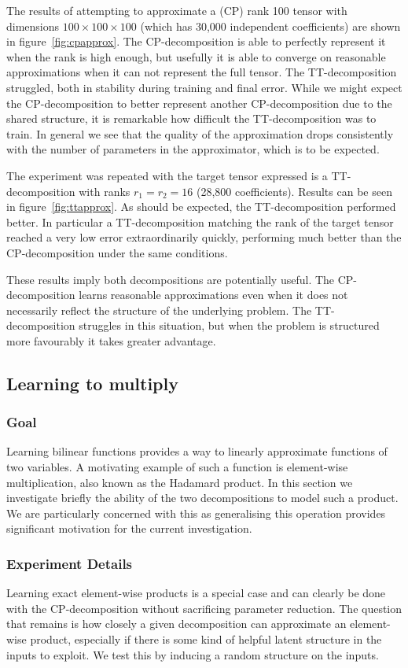 The results of attempting to approximate a (CP) rank 100 tensor with dimensions 
\(100 \times 100 \times 100\) (which has 30,000 independent coefficients) 
are shown in figure~\ref{fig:cpapprox}.
The CP-decomposition is able to perfectly represent it when the rank is high enough,
but usefully it is able to converge on reasonable approximations when it can not
represent the full tensor.
The TT-decomposition struggled, both in stability during training and final error.
While we might expect the CP-decomposition to better represent another CP-decomposition due to
the shared structure, it is remarkable how difficult the TT-decomposition was to
train.
In general we see that the quality of the approximation drops consistently with the
number of parameters in the approximator, which is to be expected.

The experiment was repeated with the target tensor expressed is a TT-decomposition with ranks
\(r_1 = r_2 = 16\) (28,800 coefficients). Results can be seen in figure~\ref{fig:ttapprox}.
As should be expected, the TT-decomposition performed better. In particular a TT-decomposition
matching the rank of the target tensor reached a very low error extraordinarily quickly,
performing much better than the CP-decomposition under the same conditions.

These results imply both decompositions are potentially useful. The CP-decomposition learns
 reasonable approximations even when it does not necessarily reflect the
structure of the underlying problem. The TT-decomposition struggles in this situation,
but when the problem is structured more favourably it takes greater advantage.

\subsection{Learning to multiply}
\subsubsection{Goal}
Learning bilinear functions provides a way to linearly approximate functions of two variables.
A motivating example of such a function is element-wise multiplication, also known as the Hadamard
product. In this section we investigate briefly the ability of the two decompositions to model
such a product. We are particularly concerned with this as generalising this operation provides
significant motivation for the current investigation.


\subsubsection{Experiment Details}
Learning exact element-wise products is a special case and can clearly be done with the 
CP-decomposition without sacrificing parameter reduction. The question that remains is how closely
a given decomposition can approximate an element-wise product, especially if there is some kind of
helpful latent structure in the inputs to exploit. We test this by inducing a random structure
on the inputs.

